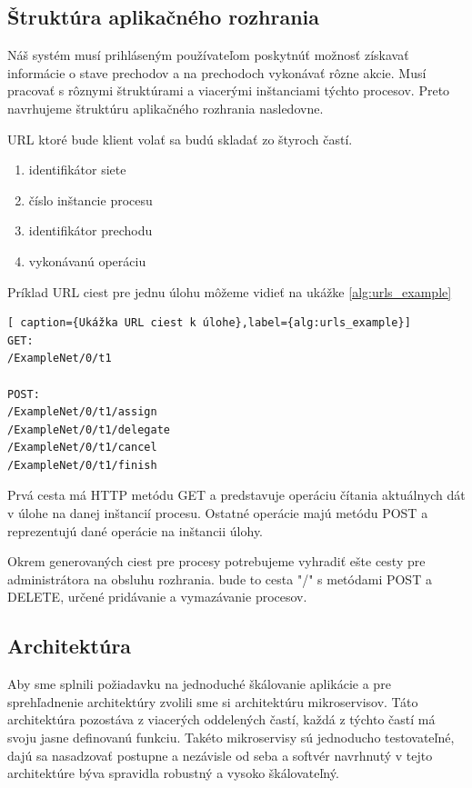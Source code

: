 \subsection{Štruktúra aplikačného rozhrania}
Náš systém musí prihláseným používateľom poskytnúť možnosť získavať informácie o stave prechodov a na prechodoch vykonávať rôzne akcie. Musí pracovať s rôznymi štruktúrami a viacerými inštanciami týchto procesov. Preto navrhujeme štruktúru aplikačného rozhrania nasledovne.

URL ktoré bude klient volať sa budú skladať zo štyroch častí.
\begin{enumerate}
	\item identifikátor siete
    \item číslo inštancie procesu
	\item identifikátor prechodu
	\item vykonávanú operáciu
\end{enumerate}
Príklad URL ciest pre jednu úlohu môžeme vidieť na ukážke \ref{alg:urls_example}

\begin{lstlisting}[ caption={Ukážka URL ciest k úlohe},label={alg:urls_example}]
GET:
/ExampleNet/0/t1

POST:
/ExampleNet/0/t1/assign
/ExampleNet/0/t1/delegate
/ExampleNet/0/t1/cancel
/ExampleNet/0/t1/finish
\end{lstlisting}

Prvá cesta má HTTP metódu GET a predstavuje operáciu čítania aktuálnych dát v úlohe na danej inštancií procesu. Ostatné operácie majú metódu POST a reprezentujú dané operácie na inštancii úlohy.

Okrem generovaných ciest pre procesy potrebujeme vyhradiť ešte cesty pre administrátora na obsluhu rozhrania. bude to cesta "/" s metódami POST a DELETE, určené pridávanie a vymazávanie procesov.

\subsection{Architektúra}
Aby sme splnili požiadavku na jednoduché škálovanie aplikácie a pre sprehľadnenie architektúry zvolili sme si architektúru mikroservisov. Táto architektúra pozostáva z viacerých oddelených častí, každá z týchto častí má svoju jasne definovanú funkciu. Takéto mikroservisy sú jednoducho testovateľné, dajú sa nasadzovať postupne a nezávisle od seba a softvér navrhnutý v tejto architektúre býva spravidla robustný a vysoko škálovateľný.

